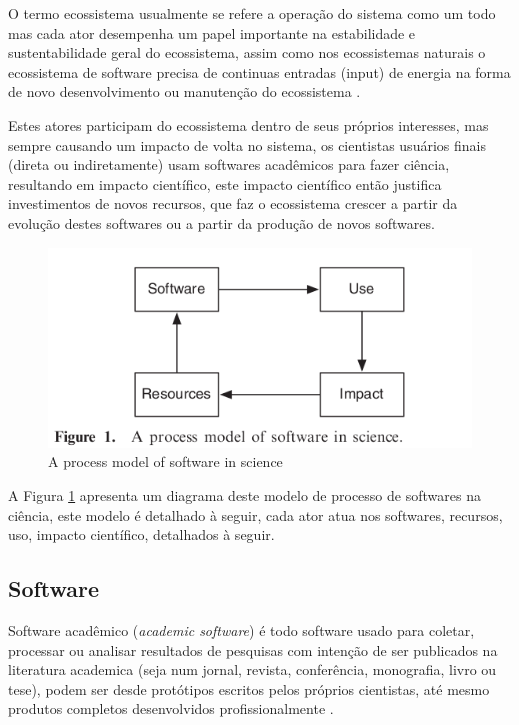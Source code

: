 
O termo ecossistema usualmente se refere a operação do sistema como um todo mas
cada ator desempenha um papel importante na estabilidade e sustentabilidade
geral do ecossistema, assim como nos ecossistemas naturais o ecossistema de
software precisa de continuas entradas (input) de energia na forma de novo
desenvolvimento ou manutenção do ecossistema \cite{dhungana2010software}.

Estes atores participam do ecossistema dentro de seus próprios interesses, mas
sempre causando um impacto de volta no sistema, os cientistas usuários finais
(direta ou indiretamente) usam softwares acadêmicos para fazer ciência,
resultando em impacto científico, este impacto científico então justifica
investimentos de novos recursos, que faz o ecossistema crescer a partir da
evolução destes softwares ou a partir da produção de novos softwares.

\begin{figure}[h]
  \center
  \includegraphics[scale=0.5]{imagens/process-model-scientific-software.png}
  \caption{A process model of software in science \cite{howison2015understanding}}
  \label{process-model-scientific-software}
\end{figure}

A Figura \ref{process-model-scientific-software} apresenta um diagrama deste
modelo de processo de softwares na ciência, este modelo é detalhado à seguir,
cada ator atua nos softwares, recursos, uso, impacto científico, detalhados à
seguir.

\subsection{Software}

Software acadêmico ({\it academic software}) é todo software usado para
coletar, processar ou analisar resultados de pesquisas com intenção de ser
publicados na literatura academica (seja num jornal, revista, conferência,
monografia, livro ou tese), podem ser desde protótipos escritos pelos próprios
cientistas, até mesmo produtos completos desenvolvidos profissionalmente
\cite{allen2017engineering}.

